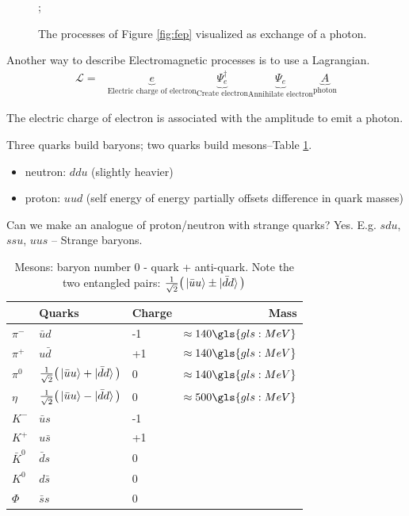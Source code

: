 \documentclass[]{article}
\begin{document}
\begin{figure}[H]
	\begin{center}
		\caption{The processes of Figure \ref{fig:fep} visualized as exchange of a photon.}\label{fig:fep2}
		;
	\end{center}
\end{figure}

Another way to describe Electromagnetic processes is to use a Lagrangian.
\begin{align*}
	\mathcal{L} =& \underbrace{e}_\text{Electric charge of electron} \underbrace{\Psi_e^\dagger}_\text{Create electron} \underbrace{\Psi_e}_\text{Annihilate electron} \underbrace{A}_\text{photon}
\end{align*}

The electric charge of electron is associated with the amplitude to emit a photon.


Three quarks build baryons; two quarks build mesons--Table \ref{table:mesons}.
\begin{itemize}
	\item neutron: $ddu$ (slightly heavier)
	\item proton: $uud$ (self energy of energy partially offsets difference in quark masses)
\end{itemize}

Can we make an analogue of proton/neutron with strange quarks? Yes. E.g. $sdu$, $ssu$, $uus$ -- Strange baryons.


\begin{table}[H]
	\begin{center}
		\caption[Mesons: baryon number 0 - quark + anti-quark]{Mesons: baryon number 0 - quark + anti-quark. Note the two entangled pairs: $\frac{1}{\sqrt{2}}\big(\ket{\bar{u}u}\pm\ket{\bar{d}d}\big)$}\label{table:mesons}
		\begin{tabular}{|l|l|l|r|} \hline
			&\textbf{Quarks}&\textbf{Charge}&\textbf{Mass}\\ \hline
			$\pi^-$&$\bar{u}d$&-1&$\approx140 \gls{gls:MeV}$ \\ \hline
			$\pi^+$&$u\bar{d}$&+1&$\approx140 \gls{gls:MeV}$  \\ \hline
			$\pi^0$&$\frac{1}{\sqrt{2}}\big(\ket{\bar{u}u}+\ket{\bar{d}d}\big)$&0&$\approx140 \gls{gls:MeV}$  \\ \hline
			$\eta$&$\frac{1}{\sqrt{2}}\big(\ket{\bar{u}u}-\ket{\bar{d}d}\big)$& 0&$\approx500 \gls{gls:MeV}$ \\ \hline
			$K^-$&$\bar{u}s$&-1& \\ \hline
			$K^+$&$u\bar{s}$&+1& \\ \hline
			$\bar{K}^0$&$\bar{d}s$&0& \\ \hline
			$K^0$&$d\bar{s}$&0& \\ \hline
			$\Phi$&$\bar{s}s$&0& \\ \hline
		\end{tabular}
	\end{center}
\end{table}
\end{document}
